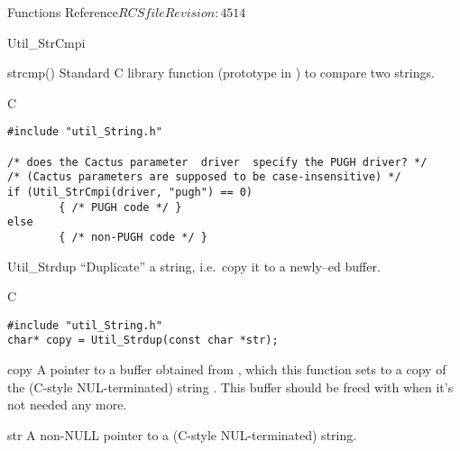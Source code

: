 \begin{cactuspart}{ Functions Reference}{$RCSfile$}{$Revision: 4514 $}
\begin{FunctionDescription}{Util\_StrCmpi}
\begin{SeeAlsoSection}
\begin{SeeAlso}{strcmp()}
Standard C library function (prototype in )
to compare two strings.
\end{SeeAlso}
\end{SeeAlsoSection}

\begin{ExampleSection}
\begin{Example}{C}
\begin{verbatim}
#include "util_String.h"

/* does the Cactus parameter  driver  specify the PUGH driver? */
/* (Cactus parameters are supposed to be case-insensitive) */
if (Util_StrCmpi(driver, "pugh") == 0)
        { /* PUGH code */ }
else
        { /* non-PUGH code */ }
\end{verbatim}
\end{Example}
\end{ExampleSection}
\end{FunctionDescription}


\begin{FunctionDescription}{Util\_Strdup}
\label{Util-Strdup}
``Duplicate'' a string, i.e.\ copy it to a newly--ed buffer.

\begin{SynopsisSection}
\begin{Synopsis}{C}
\begin{verbatim}
#include "util_String.h"
char* copy = Util_Strdup(const char *str);
\end{verbatim}
\end{Synopsis}
\end{SynopsisSection}

\begin{ResultSection}
\begin{Result}{copy}
A pointer to a buffer obtained from ,
which this function sets to a copy of the (C-style NUL-terminated)
string .  This buffer should be freed with 
when it's not needed any more.
\end{Result}
\end{ResultSection}

\begin{ParameterSection}
\begin{Parameter}{str}
A non-NULL pointer to a (C-style NUL-terminated) string.
\end{Parameter}
\end{ParameterSection}


\end{FunctionDescription}
\end{cactuspart}

